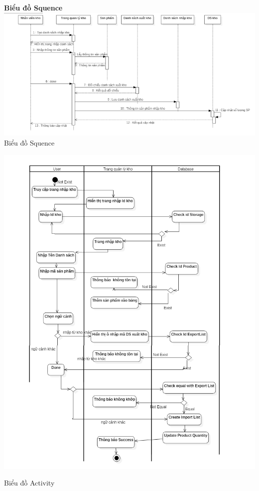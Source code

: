 \documentclass{article}
\begin{document}

\begin{center}
  \fontsize{14}{20}\selectfont\textbf{Biểu đồ Squence}
    \includegraphics[scale=0.8]{11.png}  \\
    \caption{Biểu đồ Squence}
\end{center}

\pagebreak
\centering
\includegraphics[scale = 0.5]{35.png}\\
\fontsize{13}{20}\selectfont\caption{Biểu đồ Activity}
\end{document}
